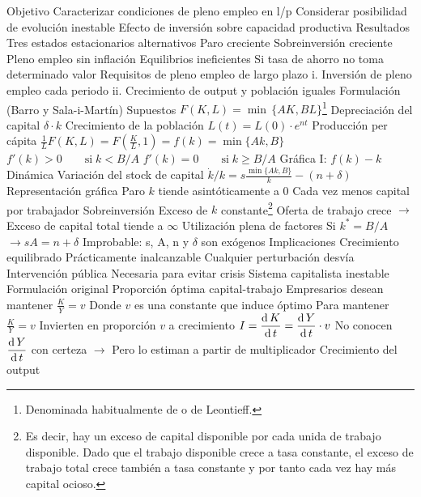 \documentclass{nuevotema}
\begin{document}
\begin{esquemal}
			\3 Objetivo
				\4 Caracterizar condiciones de pleno empleo en l/p
				\4 Considerar posibilidad de evolución inestable
				\4 Efecto de inversión sobre capacidad productiva
			\3 Resultados
				\4 Tres estados estacionarios alternativos
				\4[] Paro creciente
				\4[] Sobreinversión creciente
				\4[] Pleno empleo sin inflación
				\4 Equilibrios ineficientes
				\4[] Si tasa de ahorro no toma determinado valor
				\4 Requisitos de pleno empleo de largo plazo
				\4[] i. Inversión de pleno empleo cada periodo
				\4[] ii. Crecimiento de output y población iguales
		\2 Formulación (Barro y Sala-i-Martín)
			\3 Supuestos
				\4 $F(K,L)=\min \, \{AK, BL \}$\footnote{Denominada habitualmente de  o de Leontieff.}
				\4 Depreciación del capital
				\4[] $\delta \cdot k$
				\4 Crecimiento de la población
				\4 $L(t) = L(0) \cdot e^{nt}$
			\3 Producción per cápita
				\4 $\frac{1}{L}F(K,L) = F(\frac{K}{L}, 1) = f(k) = \min \{ Ak, B\}$
				\4 $f'(k) > 0 \qquad\text{si} \; k < B/A$
				\4 $f'(k) = 0 \qquad\text{si} \; k \geq B/A$
				\4 Gráfica I: $f(k) - k$
				\4[] 
			\3 Dinámica
				\4 Variación del stock de capital
				\4[] $\dot{k}/{k} = s \frac{\min \{ Ak, B \} }{k} - (n+\delta)$
				\4 Representación gráfica
				\4[] 
			\3 Paro
				\4 $k$ tiende asintóticamente a 0
				\4 Cada vez menos capital por trabajador
			\3 Sobreinversión
				\4 Exceso de $k$ constante\footnote{Es decir, hay un exceso de capital disponible por cada unida de trabajo disponible. Dado que el trabajo disponible crece a tasa constante, el exceso de trabajo total crece también a tasa constante y por tanto cada vez hay más capital ocioso.}
				\4 Oferta de trabajo crece
				\4[] $\rightarrow$ Exceso de capital total tiende a $\infty$
			\3 Utilización plena de factores
				\4 Si $k^* = B/A$
				\4[] $\rightarrow sA = n + \delta$
				\4 Improbable: s, A, n y $\delta$ son exógenos
		\2 Implicaciones
			\3 Crecimiento equilibrado
				\4 Prácticamente inalcanzable
				\4 Cualquier perturbación desvía
			\3 Intervención pública
				\4 Necesaria para evitar crisis
				\4 Sistema capitalista inestable
		\2 Formulación original
			\3 Proporción óptima capital-trabajo
				\4 Empresarios desean mantener $\frac{K}{Y}=v$
				\4[] Donde $v$ es una constante que induce óptimo
				\4 Para mantener $\frac{K}{Y}=v$
				\4[] Invierten en proporción $v$ a crecimiento
				\4[] $I = \dfrac{\text{d} \, K}{\text{d} \, t} = \dfrac{\text{d} \, Y}{\text{d} \, t} \cdot v$
				\4[] No conocen $\dfrac{\text{d} \, Y}{\text{d} \, t}$ con certeza
				\4[] $\to$ Pero lo estiman a partir de multiplicador
			\3 Crecimiento del output

\end{esquemal}
\end{document}
